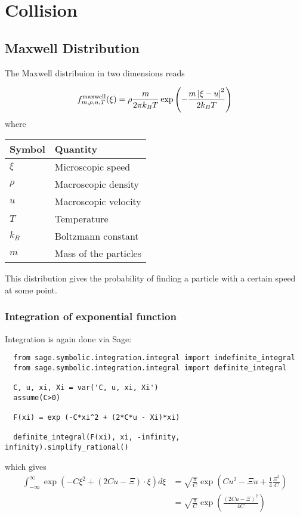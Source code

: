 \documentclass{article}
\begin{document}
\section{Collision}
\label{sec:Collision}

\subsection{Maxwell Distribution}
\label{sub:Maxwell Distribution}
The Maxwell distribuion in two dimensions reads 

\begin{equation}
  \label{eq:maxwell distribution raw}
  f_{m, \rho, u, T}^{\text{maxwell}}(\xi) = \rho \frac{m}{2\pi k_B T} \exp \left( - \frac{m\left| \xi-u \right|^2}{2 k_B T}\right)
\end{equation}
where
\begin{center}
  \begin{tabular}{@{}ll@{}}
    \toprule
    Symbol & Quantity  \\
    \midrule
    $\xi$  & Microscopic speed  \\
    $\rho$ & Macroscopic density     \\
    $u$    & Macroscopic velocity   \\
    $T$    & Temperature   \\
    $k_B$  & Boltzmann constant \\
    $m$    & Mass of the particles   \\
    \bottomrule
  \end{tabular}
\end{center}
This distribution gives the probability of finding a particle with a certain speed at some point.
\subsubsection{Integration of exponential function}
\label{subs:Integration of exponential function}

Integration is again done via Sage:
\begin{verbatim}
  from sage.symbolic.integration.integral import indefinite_integral
  from sage.symbolic.integration.integral import definite_integral

  C, u, xi, Xi = var('C, u, xi, Xi')
  assume(C>0)

  F(xi) = exp (-C*xi^2 + (2*C*u - Xi)*xi)

  definite_integral(F(xi), xi, -infinity, infinity).simplify_rational()
\end{verbatim}
which gives
\begin{equation}
  \label{eq:integrate exponential sage}
  \begin{aligned}
    \int_{-\infty}^{\infty} \exp \left(-C \xi^2 + (2Cu - \Xi)\cdot\xi \right) d\xi
    & = \sqrt{\frac{\pi}{C}}\exp \left(Cu^2 - \Xi u + \frac{1}{4} \frac{\Xi^2}{C}\right) \\
    & = \sqrt{\frac{\pi}{C}}\exp \left( \frac{{(2Cu-\Xi)}^2}{4C}\right)
  \end{aligned}
\end{equation}
\end{document}

